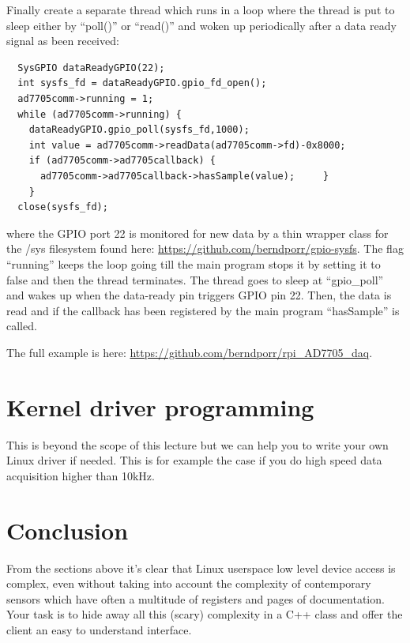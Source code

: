 \documentclass[12pt]{report}
\begin{document}
Finally create a separate thread which runs in a loop
where the thread is put to sleep either by ``poll()'' or ``read()''
and woken up periodically after a data ready
signal as been received:
\begin{verbatim}
  SysGPIO dataReadyGPIO(22);
  int sysfs_fd = dataReadyGPIO.gpio_fd_open();	
  ad7705comm->running = 1;
  while (ad7705comm->running) {
    dataReadyGPIO.gpio_poll(sysfs_fd,1000);
    int value = ad7705comm->readData(ad7705comm->fd)-0x8000;
    if (ad7705comm->ad7705callback) {
      ad7705comm->ad7705callback->hasSample(value);		}
    }
  close(sysfs_fd);
\end{verbatim}
where the GPIO port 22 is monitored for new data by a thin wrapper class for the /sys filesystem
found here: \url{https://github.com/berndporr/gpio-sysfs}. The flag ``running'' keeps
the loop going till the main program stops it by setting it to false and then the thread
terminates. The thread goes to sleep at ``gpio\_poll'' and wakes up when the data-ready
pin triggers GPIO pin 22. Then, the data is read and if the callback has been registered
by the main program ``hasSample'' is called.

The full example is here: \url{https://github.com/berndporr/rpi_AD7705_daq}.


\section{Kernel driver programming}

This is beyond the scope of this lecture but we can help you to write
your own Linux driver if needed. This is for example the case if you
do high speed data acquisition higher than 10kHz.

\section{Conclusion}

From the sections above it's clear that Linux userspace low level
device access is complex, even without taking into account the
complexity of contemporary sensors which have often a multitude of
registers and pages of documentation. Your task is to hide away
all this (scary) complexity in a C++ class and offer the client
an easy to understand interface.
\end{document}

